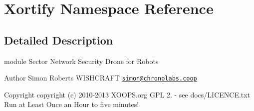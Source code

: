 \hypertarget{namespace_xortify}{\section{Xortify Namespace Reference}
\label{namespace_xortify}
}


\subsection{Detailed Description}
module  Sector Network Security Drone for Robots \begin{DoxyAuthor}{Author}
Simon Roberts W\-I\-S\-H\-C\-R\-A\-F\-T \href{mailto:simon@chronolabs.coop}{\tt simon@chronolabs.\-coop} 
\end{DoxyAuthor}
\begin{DoxyCopyright}{Copyright}
copyright (c) 2010-\/2013 X\-O\-O\-P\-S.\-org  G\-P\-L 2. -\/ see docs/\-L\-I\-C\-E\-N\-C\-E.\-txt  Run at Least Once an Hour to five minutes! 
\end{DoxyCopyright}
